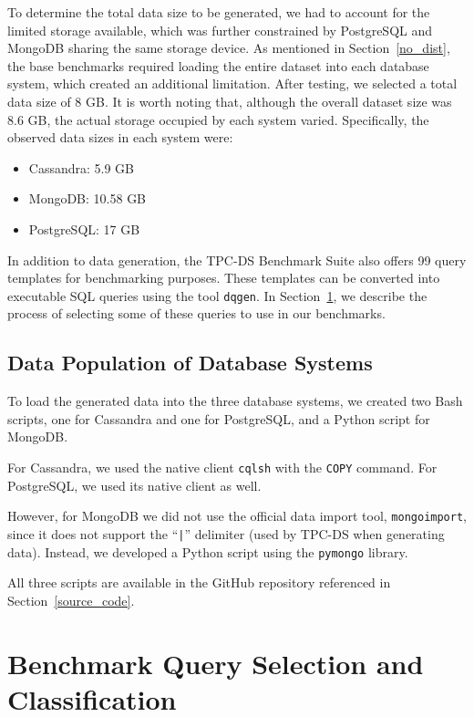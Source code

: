 \documentclass[conference]{IEEEtran}
\begin{document}
To determine the total data size to be generated, we had to account for the limited storage available, which was further constrained by PostgreSQL and MongoDB sharing the same storage device. As mentioned in Section~\ref{no_dist}, the base benchmarks required loading the entire dataset into each database system, which created an additional limitation. After testing, we selected a total data size of 8 GB. It is worth noting that, although the overall dataset size was 8.6 GB, the actual storage occupied by each system varied. Specifically, the observed data sizes in each system were:

\begin{itemize}
    \item Cassandra: 5.9 GB
    \item MongoDB: 10.58 GB
    \item PostgreSQL: 17 GB
\end{itemize}


In addition to data generation, the TPC-DS Benchmark Suite also offers 99 query templates for benchmarking purposes. These templates can be converted into executable SQL queries using the tool \texttt{dqgen}. In Section~\ref{query_selection}, we describe the process of selecting some of these queries to use in our benchmarks.


\subsection{Data Population of Database Systems}

To load the generated data into the three database systems, we created two Bash scripts,
one for Cassandra and one for PostgreSQL, and a Python script for MongoDB.

For Cassandra, we used the native client \texttt{cqlsh} with the \texttt{COPY} command.
For PostgreSQL, we used its native client as well.

However, for MongoDB we did not use the official data import tool, \texttt{mongoimport},
since it does not support the ``\texttt{|}'' delimiter (used by TPC-DS when generating data).
Instead, we developed a Python script using the \texttt{pymongo} library.

All three scripts are available in the GitHub repository referenced in Section~\ref{source_code}.

\section{Benchmark Query Selection and Classification}\label{query_selection}
\end{document}
